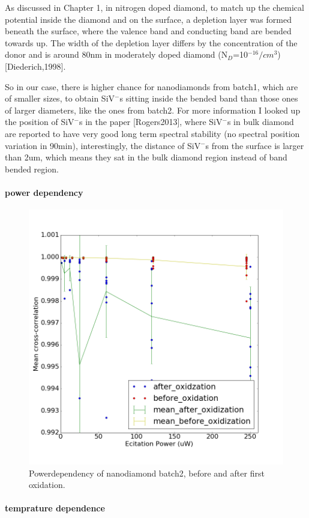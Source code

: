 As discussed in Chapter 1, in nitrogen doped diamond, to match up the chemical potential inside the diamond and on the surface, a depletion layer was formed beneath the surface, where the valence band and conducting band are bended towards up. The width of the depletion layer differs by the concentration of the donor and is around 80nm in moderately doped diamond (N$_{D}$=10$^{-16}/cm^{3}$)[Diederich,1998].

So in our case, there is higher chance for nanodiamonds from batch1, which are of smaller sizes, to obtain SiV$^{-}$s sitting inside the bended band than those ones of larger diameters, like the ones from batch2. For more information I looked up the position of SiV$^{-}$s in the paper [Rogers2013], where SiV$^{-}$s in bulk diamond are reported to have very good long term spectral stability (no spectral position variation in 90min), interestingly, the distance of SiV$^{-}$s from the surface is larger than 2um, which means they sat in the bulk diamond region instead of band bended region. 

\paragraph{power dependency}
\begin{figure}[h]
\centering
\includegraphics[width=0.7\linewidth]{Figures/pic/powerdependencybeforeafteroxidation}
\caption{Powerdependency of nanodiamond batch2, before and after first oxidation.}
\label{fig:powerdependencybeforeafteroxidation}
\end{figure}

\paragraph{temprature dependence}



